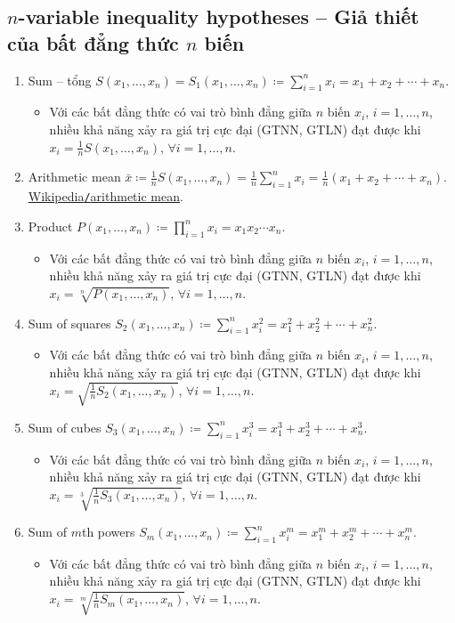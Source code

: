 \documentclass{article}
\begin{document}
\subsection{$n$-variable inequality hypotheses -- Giả thiết của bất đẳng thức $n$ biến}

\begin{enumerate}
	\item Sum -- tổng $S(x_1,\ldots,x_n) = S_1(x_1,\ldots,x_n)\coloneqq\sum_{i=1}^n x_i = x_1 + x_2 + \cdots + x_n$.
	\begin{itemize}
		\item Với các bất đẳng thức có vai trò bình đẳng giữa $n$ biến $x_i$, $i = 1,\ldots,n$, nhiều khả năng xảy ra giá trị cực đại (GTNN, GTLN) đạt được khi $x_i = \frac{1}{n}S(x_1,\ldots,x_n)$, $\forall i = 1,\ldots,n$.
	\end{itemize}	
	\item Arithmetic mean $\bar{x}\coloneqq\frac{1}{n}S(x_1,\ldots,x_n) = \frac{1}{n}\sum_{i=1}^n x_i = \frac{1}{n}(x_1 + x_2 + \cdots + x_n)$. \href{https://en.wikipedia.org/wiki/Arithmetic_mean}{Wikipedia{\tt/}arithmetic mean}.
	\item Product $P(x_1,\ldots,x_n)\coloneqq\prod_{i=1}^n x_i = x_1x_2\cdots x_n$.
	\begin{itemize}
		\item Với các bất đẳng thức có vai trò bình đẳng giữa $n$ biến $x_i$, $i = 1,\ldots,n$, nhiều khả năng xảy ra giá trị cực đại (GTNN, GTLN) đạt được khi $x_i = \sqrt[n]{P(x_1,\ldots,x_n)}$, $\forall i = 1,\ldots,n$.
	\end{itemize}
	\item Sum of squares $S_2(x_1,\ldots,x_n)\coloneqq\sum_{i=1}^n x_i^2 = x_1^2 + x_2^2 + \cdots + x_n^2$.
	\begin{itemize}
		\item Với các bất đẳng thức có vai trò bình đẳng giữa $n$ biến $x_i$, $i = 1,\ldots,n$, nhiều khả năng xảy ra giá trị cực đại (GTNN, GTLN) đạt được khi $x_i = \sqrt{\frac{1}{n}S_2(x_1,\ldots,x_n)}$, $\forall i = 1,\ldots,n$.
	\end{itemize}
	\item Sum of cubes $S_3(x_1,\ldots,x_n)\coloneqq\sum_{i=1}^n x_i^3 = x_1^3 + x_2^3 + \cdots + x_n^3$.
	\begin{itemize}
		\item Với các bất đẳng thức có vai trò bình đẳng giữa $n$ biến $x_i$, $i = 1,\ldots,n$, nhiều khả năng xảy ra giá trị cực đại (GTNN, GTLN) đạt được khi $x_i = \sqrt[3]{\frac{1}{n}S_3(x_1,\ldots,x_n)}$, $\forall i = 1,\ldots,n$.
	\end{itemize}
	\item Sum of $m$th powers $S_m(x_1,\ldots,x_n)\coloneqq\sum_{i=1}^n x_i^m = x_1^m + x_2^m + \cdots + x_n^m$.
	\begin{itemize}
		\item Với các bất đẳng thức có vai trò bình đẳng giữa $n$ biến $x_i$, $i = 1,\ldots,n$, nhiều khả năng xảy ra giá trị cực đại (GTNN, GTLN) đạt được khi $x_i = \sqrt[m]{\frac{1}{n}S_m(x_1,\ldots,x_n)}$, $\forall i = 1,\ldots,n$.
	\end{itemize}
\end{enumerate}
\end{document}
